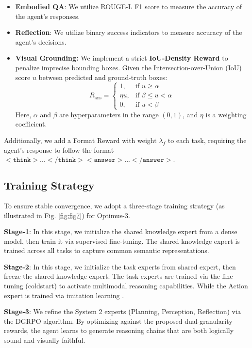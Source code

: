 \begin{itemize}
    \item \textbf{Embodied QA}: We utilize ROUGE-L F1 score to measure the accuracy of the agent's responses.
    \item \textbf{Reflection}: We utilize binary success indicators to measure accuracy of the agent's decisions.
    \item \textbf{Visual Grounding:} We implement a strict \textbf{IoU-Density Reward} to penalize imprecise bounding boxes. Given the Intersection-over-Union (IoU) score $u$ between predicted and ground-truth boxes:
    \begin{equation}
    R_{\text{ans}} = 
    \begin{cases}
    1, & \text{if } u \ge \alpha \\
    \eta u, & \text{if } \beta \le u < \alpha \\
    0, & \text{if } u < \beta
    \end{cases}
    \end{equation}
    Here, $\alpha$ and $\beta$ are hyperparameters in the range $(0, 1)$, and $\eta$ is a weighting coefficient.
\end{itemize}

Additionally, we add a Format Reward with weight $\lambda_f$ to each task, requiring the agent's response to follow the format $<\texttt{think}>...</\texttt{think}><\texttt{answer}>...</\texttt{answer}>$.


\subsection{Training Strategy}
\label{training_strategy}
To ensure stable convergence, we adopt a three-stage training strategy (as illustrated in Fig. \ref{fig:fig7}) for Optimus-3.

\noindent\textbf{Stage-1}: In this stage, we initialize the shared knowledge expert from a dense model, then train it via supervised fine-tuning. The shared knowledge expert is trained across all tasks to capture common semantic representations. 

\noindent\textbf{Stage-2}: In this stage, we initialize the task experts from shared expert, then freeze the shared knowledge expert. The task experts are trained via the fine-tuning (coldstart) to activate multimodal reasoning capabilities. While the Action expert is trained via imitation learning \cite{li2025optimus}.

\noindent\textbf{Stage-3}: We refine the System 2 experts (Planning, Perception, Reflection) via the DGRPO algorithm. By optimizing against the proposed dual-granularity rewards, the agent learns to generate reasoning chains that are both logically sound and visually faithful.


